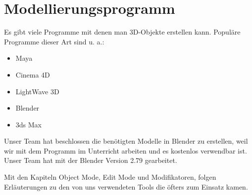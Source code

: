 \section{Modellierungsprogramm}
Es gibt viele Programme mit denen man 3D-Objekte erstellen kann.\citep{wiki:modellierungsprogramm_beispiele}
Populäre Programme dieser Art sind u. a.:

\begin{itemize}
    \item Maya
    \item Cinema 4D
    \item LightWave 3D
    \item Blender
    \item 3ds Max
\end{itemize}

Unser Team hat beschlossen die benötigten Modelle in Blender zu erstellen, weil wir mit dem Programm im Unterricht arbeiten und
es kostenlos verwendbar ist. Unser Team hat mit der Blender Version 2.79 gearbeitet.

Mit den Kapiteln Object Mode, Edit Mode und Modifikatoren, folgen Erläuterungen zu
den von uns verwendeten Tools die öfters zum Einsatz kamen.
